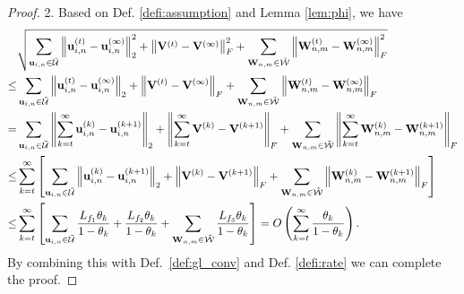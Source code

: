 \documentclass{article}
\begin{document}
\begin{proof}
2. Based on Def. \ref{defi:assumption} and Lemma \ref{lem:phi}, we have
\begin{align}
&\sqrt{\sum_{\mathbf{u}_{i,n}\in\tilde{\mathcal{U}}}\left\|\mathbf{u}_{i,n}^{(t)}-\mathbf{u}_{i,n}^{(\infty)}\right\|_2^2 + \left\|\mathbf{V}^{(t)}-\mathbf{V}^{(\infty)}\right\|_F^2 + \sum_{\mathbf{W}_{n,m}\in\tilde{\mathcal{W}}}\left\|\mathbf{W}_{n,m}^{(t)}-\mathbf{W}_{n,m}^{(\infty)}\right\|_F^2} \nonumber \\
\leq & \sum_{\mathbf{u}_{i,n}\in\tilde{\mathcal{U}}}\left\|\mathbf{u}_{i,n}^{(t)}-\mathbf{u}_{i,n}^{(\infty)}\right\|_2 + \left\|\mathbf{V}^{(t)}-\mathbf{V}^{(\infty)}\right\|_F + \sum_{\mathbf{W}_{n,m}\in\tilde{\mathcal{W}}}\left\|\mathbf{W}_{n,m}^{(t)}-\mathbf{W}_{n,m}^{(\infty)}\right\|_F \nonumber \\
= & \hspace{0mm}\sum_{\mathbf{u}_{i,n}\in\tilde{\mathcal{U}}}\left\|\sum_{k=t}^{\infty}\mathbf{u}_{i,n}^{(k)}-\mathbf{u}_{i,n}^{(k+1)}\right\|_2 + \left\|\sum_{k=t}^{\infty}\mathbf{V}^{(k)}-\mathbf{V}^{(k+1)}\right\|_F + \hspace{0mm} \sum_{\mathbf{W}_{n,m}\in\tilde{\mathcal{W}}}\left\|\sum_{k=t}^{\infty}\mathbf{W}_{n,m}^{(k)}-\mathbf{W}_{n,m}^{(k+1)}\right\|_F \nonumber \\
\leq & \sum_{k=t}^{\infty}\left[\sum_{\mathbf{u}_{i,n}\in\tilde{\mathcal{U}}}\left\|\mathbf{u}_{i,n}^{(k)}-\mathbf{u}_{i,n}^{(k+1)}\right\|_2 + \left\|\mathbf{V}^{(k)}-\mathbf{V}^{(k+1)}\right\|_F + \sum_{\mathbf{W}_{n,m}\in\tilde{\mathcal{W}}}\left\|\mathbf{W}_{n,m}^{(k)}-\mathbf{W}_{n,m}^{(k+1)}\right\|_F\right] \nonumber \\
\leq & \sum_{k=t}^{\infty}\left[\sum_{\mathbf{u}_{i,n}\in\tilde{\mathcal{U}}} \frac{L_{f_1}\theta_k}{1-\theta_k} + \frac{L_{f_2}\theta_k}{1-\theta_k} + \sum_{\mathbf{W}_{n,m}\in\tilde{\mathcal{W}}}\frac{L_{f_3}\theta_k}{1-\theta_k}\right] = O\left(\sum_{k=t}^{\infty}\frac{\theta_k}{1-\theta_k}\right). \nonumber
\end{align}
By combining this with Def.~\ref{def:gl_conv} and Def. \ref{defi:rate} we can complete the proof.
\end{proof}
\end{document}
